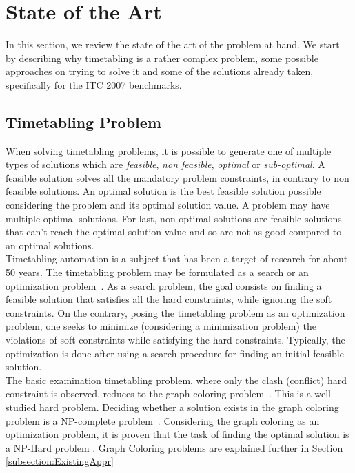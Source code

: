 \chapter{State of the Art}
\label{theory}
\thispagestyle{plain}

In this section, we review the state of the art of the problem at hand. We start by describing why timetabling is a rather complex problem, some possible approaches on trying to solve it and some of the solutions already taken, specifically for the ITC 2007 benchmarks.\\

\section{Timetabling Problem}

When solving timetabling problems, it is possible to generate one of multiple types of solutions which are \textit{feasible}, \textit{non feasible}, \textit{optimal} or \textit{sub-optimal}. A feasible solution solves all the mandatory problem constraints, in contrary to non feasible solutions. An optimal solution is the best feasible solution possible considering the problem and its optimal solution value. A problem may have multiple optimal solutions. For last, non-optimal solutions are feasible solutions that can't reach the optimal solution value and so are not as good compared to an optimal solutions.\\

Timetabling automation is a subject that has been a target of research for about 50 years. The timetabling problem may be formulated as a search or an optimization problem~\cite{Schaerf1999}. As a search problem, the goal consists on finding a feasible solution that satisfies all the hard constraints, while ignoring the soft constraints. On the contrary, posing the timetabling problem as an optimization problem, one seeks to minimize (considering a minimization problem) the violations of soft constraints while satisfying the hard constraints. Typically, the optimization is done after using a search procedure for finding an initial feasible solution.\\

The basic examination timetabling problem, where only the clash (conflict) hard constraint is observed, reduces to the graph coloring problem~\cite{Jensen2001}. This is a well studied hard problem. Deciding whether a solution exists in the graph coloring problem is a NP-complete problem~\cite{Arora2009}. Considering the graph coloring as an optimization problem, it is proven that the task of finding the optimal solution is a NP-Hard problem \cite{Arora2009}. Graph Coloring problems are explained further in Section \ref{subsection:ExistingAppr}
\\
